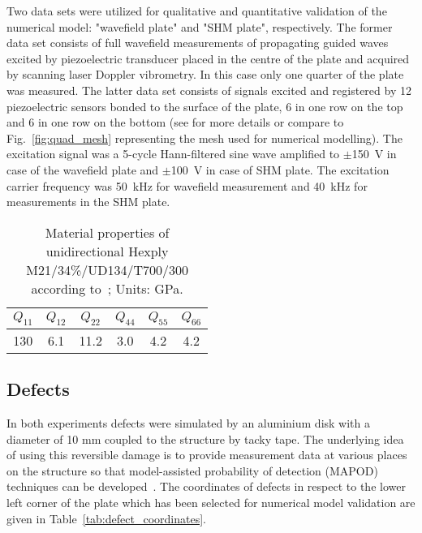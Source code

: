 \documentclass[preprint,12pt]{elsarticle}
\begin{document}
	Two data sets were utilized for qualitative and quantitative validation of the numerical model: "wavefield plate" and "SHM plate", respectively. The former data set consists of full wavefield measurements of propagating guided waves excited by piezoelectric transducer placed in the centre of the plate and acquired by scanning laser Doppler vibrometry. In this case only one quarter of the plate was measured. The latter data set consists of signals excited and registered by 12 piezoelectric sensors bonded to the surface of the plate, 6 in one row on the top and 6 in one row on the bottom (see \cite{Moll2018} for more details or compare to Fig.~\ref{fig:quad_mesh} representing the mesh used for numerical modelling). The excitation signal was a 5-cycle Hann-filtered sine wave amplified to $\pm$150~V in case of the wavefield plate and  $\pm$100~V in case of SHM plate. The excitation carrier frequency was 50~kHz for wavefield measurement and 40~kHz for measurements in the SHM plate.
	\begin{table}
		\renewcommand{\arraystretch}{1.3}
		\centering \footnotesize
		\caption{Material properties of unidirectional Hexply M21/34\%/UD134/T700/300 according to~\cite{Moll2018}; Units: GPa.}
		\begin{tabular}{cccccc} 
			\toprule
			$Q_{11}$ & $Q_{12}$  & $Q_{22}$ & $Q_{44}$ & $Q_{55}$ & $Q_{66}$\\
			\midrule
			130& 6.1& 11.2 & 3.0 & 4.2 & 4.2\\
			\bottomrule 
		\end{tabular} 
		\label{tab:mat_prop}
	\end{table}
	\subsection{Defects}
	In both experiments defects were simulated by an aluminium disk with a diameter of 10 mm coupled to the structure by tacky tape. The underlying idea of using this reversible damage is to provide measurement data at various places on the structure so that model-assisted probability of detection (MAPOD) techniques can be developed~\cite{Eckstein2012}. The coordinates of defects in respect to the lower left corner of the plate which has been selected for numerical model validation are given in Table~\ref{tab:defect_coordinates}.
	
\end{document}
